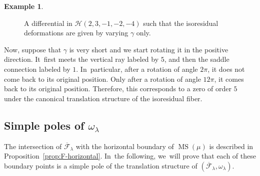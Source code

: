\documentclass[JEP,XML,SOM,Unicode,NoFloatCountersInSection,published]{cedram}
\DeclareMathOperator\MS{MS}
\theoremstyle{definition}
\newtheorem{ex}[thm]{Example}
\begin{document}
\begin{ex}
\begin{figure}[ht]
\caption{A differential in $\mathcal{H}(2,3,-1,-2,-4)$ such that the isoresidual deformations are given by varying $\gamma$ only.} \label{fig:isores1}
\end{figure}
Now, suppose that $\gamma$ is very short and we start rotating it in the positive direction. It~first meets the vertical ray labeled by $5$, and then the saddle connection labeled by $1$. In~particular, after a rotation of angle $2\pi$, it does not come back to its original position. Only after a rotation of angle $12\pi$, it comes back to its original position. Therefore, this corresponds to a zero of order $5$ under the canonical translation structure of the isoresidual fiber.
\end{ex}

\subsection{Simple poles of $\omega_{\lambda}$}\label{subsub:SimplePoles}

The intersection of $\overline{\mathcal{F}}_{\lambda}$ with the horizontal boundary of $\MS(\mu)$ is described in Proposition~\ref{prop:F-horizontal}. In~the following, we~will prove that each of these boundary points is a simple pole of the translation structure of $(\overline{\mathcal{F}}_{\lambda},\omega_{\lambda})$.
\end{document}
